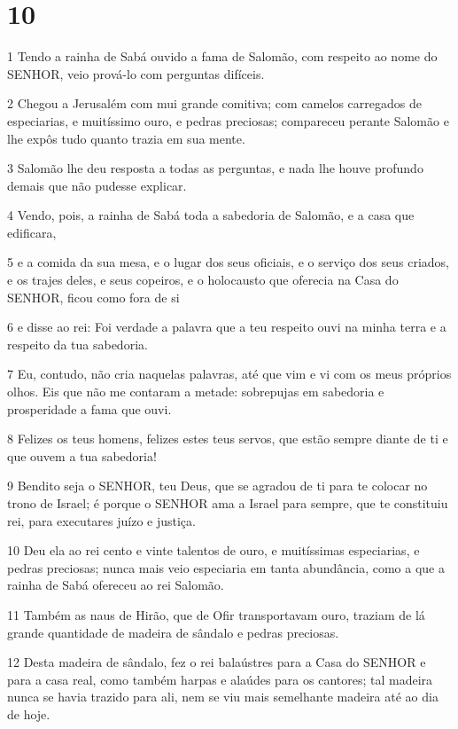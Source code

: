 \chapter{10}

\par 1 Tendo a rainha de Sabá ouvido a fama de Salomão, com respeito ao nome do SENHOR, veio prová-lo com perguntas difíceis.
\par 2 Chegou a Jerusalém com mui grande comitiva; com camelos carregados de especiarias, e muitíssimo ouro, e pedras preciosas; compareceu perante Salomão e lhe expôs tudo quanto trazia em sua mente.
\par 3 Salomão lhe deu resposta a todas as perguntas, e nada lhe houve profundo demais que não pudesse explicar.
\par 4 Vendo, pois, a rainha de Sabá toda a sabedoria de Salomão, e a casa que edificara,
\par 5 e a comida da sua mesa, e o lugar dos seus oficiais, e o serviço dos seus criados, e os trajes deles, e seus copeiros, e o holocausto que oferecia na Casa do SENHOR, ficou como fora de si
\par 6 e disse ao rei: Foi verdade a palavra que a teu respeito ouvi na minha terra e a respeito da tua sabedoria.
\par 7 Eu, contudo, não cria naquelas palavras, até que vim e vi com os meus próprios olhos. Eis que não me contaram a metade: sobrepujas em sabedoria e prosperidade a fama que ouvi.
\par 8 Felizes os teus homens, felizes estes teus servos, que estão sempre diante de ti e que ouvem a tua sabedoria!
\par 9 Bendito seja o SENHOR, teu Deus, que se agradou de ti para te colocar no trono de Israel; é porque o SENHOR ama a Israel para sempre, que te constituiu rei, para executares juízo e justiça.
\par 10 Deu ela ao rei cento e vinte talentos de ouro, e muitíssimas especiarias, e pedras preciosas; nunca mais veio especiaria em tanta abundância, como a que a rainha de Sabá ofereceu ao rei Salomão.
\par 11 Também as naus de Hirão, que de Ofir transportavam ouro, traziam de lá grande quantidade de madeira de sândalo e pedras preciosas.
\par 12 Desta madeira de sândalo, fez o rei balaústres para a Casa do SENHOR e para a casa real, como também harpas e alaúdes para os cantores; tal madeira nunca se havia trazido para ali, nem se viu mais semelhante madeira até ao dia de hoje.
